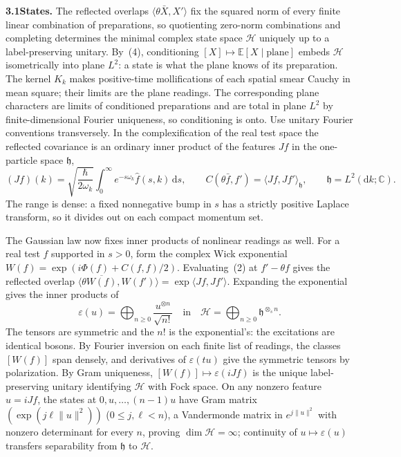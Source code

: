 \documentclass[10pt,a4paper]{article}
\newcommand{\dd}{\mathrm{d}}
\newcommand{\C}{\mathbb{C}}
\newcommand{\E}{\mathbb{E}}
\newcommand{\hh}{\mathfrak{h}}
\newcommand{\HH}{\mathcal{H}}
\begin{document}
\noindent\textbf{3.1\enspace States.} The reflected overlaps $\langle \theta\bar{X}, X'\rangle$ fix the squared norm of every finite linear combination of preparations, so quotienting zero-norm combinations and completing determines the minimal complex state space $\HH$ uniquely up to a label-preserving unitary. By~(4), conditioning $[X] \mapsto \E[X \mid \text{plane}]$ embeds $\HH$ isometrically into plane $L^2$: a state is what the plane knows of its preparation. The kernel $K_k$ makes positive-time mollifications of each spatial smear Cauchy in mean square; their limits are the plane readings. The corresponding plane characters are limits of conditioned preparations and are total in plane $L^2$ by finite-dimensional Fourier uniqueness, so conditioning is onto. Use unitary Fourier conventions transversely. In the complexification of the real test space the reflected covariance is an ordinary inner product of the features $Jf$ in the one-particle space $\hh$,
\begin{equation}
  (Jf)(k) = \sqrt{\frac{\hbar}{2\omega_k}}\int_0^\infty e^{-s\omega_k}\hat{f}(s, k)\,\dd s,
  \qquad
  C(\theta\bar{f}, f') = \langle Jf, Jf'\rangle_{\hh},
  \qquad
  \hh = L^2(\dd k; \C).
\end{equation}
The range is dense: a fixed nonnegative bump in $s$ has a strictly positive Laplace transform, so it divides out on each compact momentum set.

The Gaussian law now fixes inner products of nonlinear readings as well. For a real test $f$ supported in $s > 0$, form the complex Wick exponential $W(f) = \exp(i\Phi(f) + C(f,f)/2)$. Evaluating~(2) at $f' - \theta f$ gives the reflected overlap $\langle\theta\overline{W(f)}, W(f')\rangle = \exp\langle Jf, Jf'\rangle$. Expanding the exponential gives the inner products of
\begin{equation}
  \varepsilon(u) = \bigoplus_{n\ge 0}\frac{u^{\otimes n}}{\sqrt{n!}}
  \quad\text{in}\quad
  \HH = \bigoplus_{n\ge 0}\hh^{\otimes_s n}.
\end{equation}
The tensors are symmetric and the $n!$ is the exponential's: the excitations are identical bosons. By Fourier inversion on each finite list of readings, the classes $[W(f)]$ span densely, and derivatives of $\varepsilon(tu)$ give the symmetric tensors by polarization. By Gram uniqueness, $[W(f)] \mapsto \varepsilon(iJf)$ is the unique label-preserving unitary identifying $\HH$ with Fock space. On any nonzero feature $u = iJf$, the states at $0, u, \dots, (n-1)u$ have Gram matrix $(\exp(j\ell\|u\|^2))$ ($0 \le j, \ell < n$), a Vandermonde matrix in $e^{j\|u\|^2}$ with nonzero determinant for every $n$, proving $\dim\HH = \infty$; continuity of $u \mapsto \varepsilon(u)$ transfers separability from $\hh$ to $\HH$.
\end{document}
